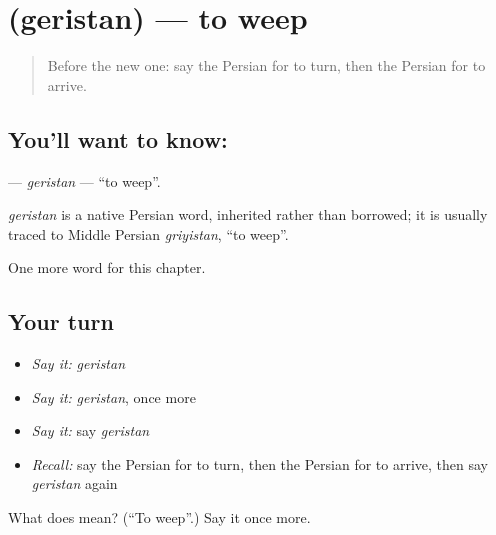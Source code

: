 \section[\texorpdfstring{\fa{گریستن} (geristan)}{گریستن (geristan)}]{ (geristan) — to weep}

\label{lesson:FA-C133-geristan}



\begin{quote}
Before the new one: say the Persian for to turn, then the Persian for to arrive.
\end{quote}

\subsection*{You'll want to know: }
\textbf{} — \emph{geristan} — \textquotedblleft{}to weep\textquotedblright{}.

\begin{cousinweb}
\emph{geristan} is a native Persian word, inherited rather than borrowed; it is usually traced to Middle Persian \emph{griyistan}, \textquotedblleft{}to weep\textquotedblright{}.
\end{cousinweb}

\begin{grammarlens}[title={What you've built}]
One more word for this chapter.
\end{grammarlens}

\subsection*{Your turn}
\begin{itemize}
\raggedright
  \item \emph{Say it:} \emph{geristan}
  \item \emph{Say it:} \emph{geristan}, once more
  \item \emph{Say it:} say \emph{geristan}
  \item \emph{Recall:} say the Persian for to turn, then the Persian for to arrive, then say \emph{geristan} again
\end{itemize}

\begin{tcolorbox}[breakable,colback=teal!4,colframe=teal!35!black,title={Before you move on}]
What does  mean? (\textquotedblleft{}To weep\textquotedblright{}.) Say it once more.
\end{tcolorbox}
